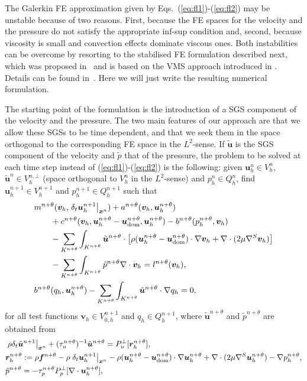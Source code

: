 \documentclass[11pt,a4paper,oneside,reqno]{amsart}
\newcommand{\Eq}[1]{(\ref{eq:#1})}
\newcommand{\sbm}[1]  {\mbox{{\boldmath{$\scriptstyle{#1}$}}}}
\def\u{{\bm u}}
\def\cl{\nonumber\\}
\def\vt{\bm v}
\begin{document}
The Galerkin FE approximation given by Eqs.~\Eq{fl1}-\Eq{fl2} may be unstable because of two reasons. First, because the FE spaces for the velocity and the pressure do not satisfy the appropriate inf-sup condition and, second, because viscosity is small and convection effects dominate viscous ones. Both instabilities can be overcome by resorting to the stabilised FE formulation described next, which was proposed in~\cite{codina6} and is based on the VMS approach introduced in \cite{hughes1}. Details can be found in~\cite{CodinaVMS}. Here we will just write the resulting numerical formulation. 

The starting point of the formulation is the introduction of a SGS component of the velocity and the pressure. The two main features of our approach are that we allow these SGSs to be time dependent, and that we seek them in the space orthogonal to the corresponding FE space in the $L^2$-sense. If $\tilde\u$ is the SGS component of the velocity and $\tilde{p}$ that of the pressure, the problem to be solved at each time step instead of \Eq{fl1}-\Eq{fl2} is the following: given $\u^n_h\in V^n_h$, $\tilde{\u}^n\in V_h^{n,\bot}$ (space orthogonal to $ V_h^{n}$ in the $L^2$-sense) and $p^n_h\in Q^n_h$, find $\u^{n+1}_h\in V^{n+1}_h$ and $p^{n+1}_h\in Q^{n+1}_h$ such that
\begin{align}
& m^{n+\theta}( \vt_h , \left. \delta_t\u_h^{n+1}\right\vert_{{\sbm x}^n})
+ a^{n+\theta}( \vt_h , \u_h^{n+\theta}) \cl
&\qquad + c^{n+\theta} (\vt_h ,  \u_h^{n+\theta}-{\u_{\rm dom}^{n+\theta}} , \u_h^{n+\theta})
- b^{n+\theta}( p_h^{n+\theta} ,\vt_h) \cl
&\qquad - \sum_{K^{n+\theta}}  \int_{K^{n+\theta}} \tilde{\u}^{n+\theta} \cdot\left[
\rho (\u_h^{n+\theta}-{\u_{\rm dom}^{n+\theta}})\cdot\nabla\vt_h + \nabla\cdot (2\mu \nabla^S\vt_h)\right] \cl
&\qquad - \sum_{K^{n+\theta}}  \int_{K^{n+\theta}} \tilde{p}^{n+\theta} \nabla \cdot \vt_h 
 = l^{n+\theta} (\vt_h) , \label{eq:fl1stab}\\
&b^{n+\theta} ( q_h , \u_h^{n+\theta} ) 
- \sum_{K^{n+\theta}}  \int_{K^{n+\theta}} \tilde{\u}^{n+\theta} \cdot \nabla q_h 
= 0,\label{eq:fl2stab}
\end{align}
for all test functions $\vt_h\in V^{n+1}_{0,h}$ and $q_h\in Q^{n+1}_h$, where $\tilde{\u}^{n+\theta}$ and $ \tilde{p}^{n+\theta} $ are obtained from
\begin{align}
& \left. \rho \delta_t \tilde{\u}^{n+1}\right\vert_{{\sbm x}^n} + (\tau_u^{n+\theta})^{-1}  \tilde{\u}^{n+\theta} 
= P_u^\bot [ {\bm r}_h^{n+\theta} ],\label{eq:sgsu}\\
& {\bm r}_h^{n+\theta}  := \rho {\bm f}^{n+\theta} - \rho \left. \delta_t\u_h^{n+1}\right\vert_{{\sbm x}^n}
-  \rho (\u_h^{n+\theta}-{\u_{\rm dom}^{n+\theta}})\cdot\nabla\u_h^{n+\theta}
+ \nabla\cdot (2\mu \nabla^S\u_h^{n+\theta}) - \nabla p_h^{n+\theta},\cl
& \tilde{p}^{n+\theta}  = -\tau_p^{n+\theta} P_p^\bot [\nabla \cdot\u_h^{n+\theta}],\label{eq:sgsp}
\end{align}
\end{document}
